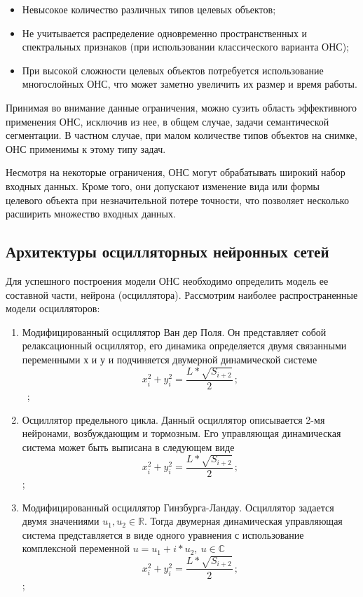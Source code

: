 \documentclass[14pt, russian]{scrartcl}
\begin{document}
\begin{itemize}
    \item Невысокое количество различных типов целевых объектов;
    \item Не учитывается распределение одновременно пространственных и спектральных признаков (при использовании классического варианта ОНС);
    \item При высокой сложности целевых объектов потребуется использование многослойных ОНС, что может заметно увеличить их размер и время работы.
\end{itemize}

Принимая во внимание данные ограничения, можно сузить область эффективного применения ОНС, исключив из нее, в общем случае, задачи семантической сегментации. В частном случае, при малом количестве типов объектов на снимке, ОНС применимы к этому типу задач.

Несмотря на некоторые ограничения, ОНС могут обрабатывать широкий набор входных данных. Кроме того, они допускают изменение вида или формы целевого объекта при незначительной потере точности, что позволяет несколько расширить множество входных данных.

\subsection{Архитектуры осцилляторных нейронных сетей}

Для успешного построения модели ОНС необходимо определить модель ее составной части, нейрона (осциллятора). Рассмотрим наиболее распространенные модели осцилляторов:

\begin{enumerate}
    \item Модифицированный осциллятор Ван дер Поля. Он представляет собой релаксационный осциллятор, его динамика определяется двумя связанными переменными х и у и подчиняется двумерной динамической системе
        \begin{equation}\label{eq:1}
            x_i^2 + y^2_i = \frac{L*\sqrt{S_{i+2}}}{2}\,;
        \end{equation} ~\cite{27};
    \item Осциллятор предельного цикла. Данный осциллятор описывается 2-мя нейронами, возбуждающим и тормозным. Его управляющая динамическая система может быть выписана в следующем виде
        \begin{equation}\label{eq:2}
            x_i^2 + y^2_i = \frac{L*\sqrt{S_{i+2}}}{2}\,;
        \end{equation};
    \item Модифицированный осциллятор Гинзбурга-Ландау. Осциллятор задается двумя значениями $u_1, u_2 \in \mathbb{R} $. Тогда двумерная динамическая управляющая система представляется в виде одного уравнения с использование комплексной переменной $u = u_1 + i*u_2,\ u \in \mathbb{C}$
        \begin{equation}\label{eq:3}
            x_i^2 + y^2_i = \frac{L*\sqrt{S_{i+2}}}{2}\,;
        \end{equation};
\end{enumerate}
\end{document}

